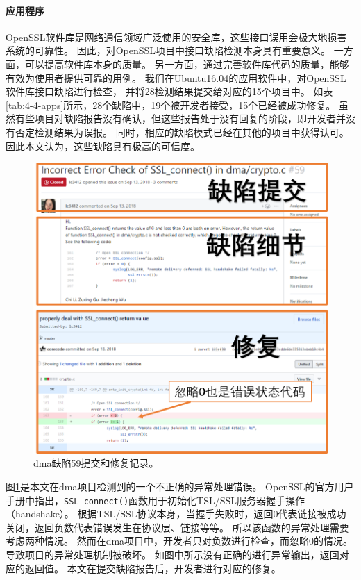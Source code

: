 \paragraph{应用程序}


OpenSSL软件库是网络通信领域广泛使用的安全库，这些接口误用会极大地损害系统的可靠性。
因此，对OpenSSL项目中接口缺陷检测本身具有重要意义。
一方面，可以提高软件库本身的质量。
另一方面，通过完善软件库代码的质量，能够有效为使用者提供可靠的用例。
我们在Ubuntu16.04的应用软件中，对OpenSSL软件库接口缺陷进行检查，
并将28检测结果提交给对应的15个项目中。
如表\ref{tab:4-4-apps}所示，28个缺陷中，19个被开发者接受，15个已经被成功修复。
虽然有些项目对缺陷报告没有确认，但这些报告处于没有回复的阶段，即开发者并没有否定检测结果为误报。
同时，相应的缺陷模式已经在其他的项目中获得认可。
因此本文认为，这些缺陷具有极高的可信度。

\begin{figure}[!b]
	\centering
	\includegraphics[width=0.8\linewidth]{figures/cp4-dma-example.png}
	\caption{
		dma缺陷59提交和修复记录。
	}
	\label{fig:4-4-dma-example}
\end{figure}

图\ref{fig:4-4-dma-example}是本文在dma项目检测到的一个不正确的异常处理错误。
OpenSSL的官方用户手册中指出，\texttt{SSL\_connect()}函数用于初始化TSL/SSL服务器握手操作（handshake）。
根据TSL/SSL协议本身，当握手失败时，返回0代表链接被成功关闭，返回负数代表错误发生在协议层、链接等等。
所以该函数的异常处理需要考虑两种情况。
然而在dma项目中，开发者只对负数进行检查，而忽略0的情况。
导致项目的异常处理机制被破坏。
如图中所示没有正确的进行异常输出，返回对应的返回值。
本文在提交缺陷报告后，开发者进行对应的修复。



